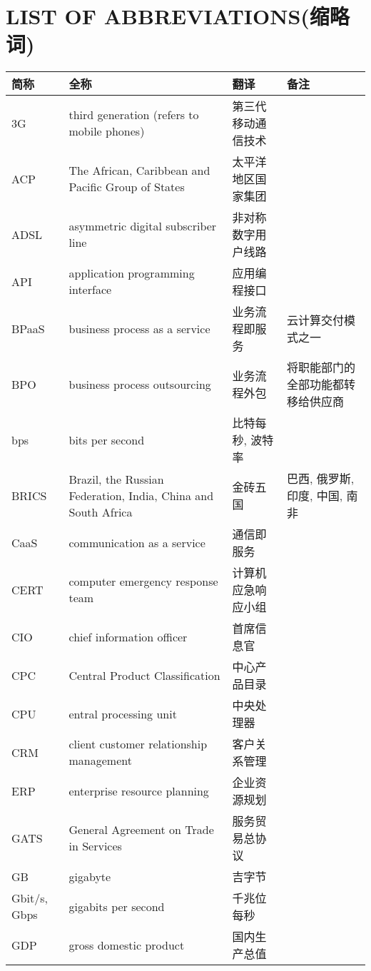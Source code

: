 \documentclass[a4paper, UTF8, 12pt]{article}
\begin{document}
\section{LIST OF ABBREVIATIONS(缩略词)}
\begin{longtable}{m{2cm}m{3cm}m{3cm}m{4cm}}
    \hline
    {\bfseries 简称} & {\bfseries 全称} & {\bfseries 翻译} & {\bfseries 备注}\\[5pt] \hline
    3G & third generation (refers to mobile phones) & 第三代移动通信技术 & \\
    \hline
    ACP & The African, Caribbean and Pacific Group of States & 太平洋地区国家集团 & \\
    \hline
    ADSL & asymmetric digital subscriber line & 非对称数字用户线路 & \\  
    \hline
    API & application programming interface & 应用编程接口 & \\
    \hline
    BPaaS & business process as a service & 业务流程即服务 & 云计算交付模式之一 \\
    \hline
    BPO & business process outsourcing & 业务流程外包 & 将职能部门的全部功能都转移给供应商 \\
    \hline
    bps & bits per second & 比特每秒, 波特率 & \\
    \hline
    BRICS & Brazil, the Russian Federation, India, China and South Africa & 金砖五国 & 巴西, 俄罗斯, 印度, 中国, 南非\\
    \hline
    CaaS & communication as a service & 通信即服务 & \\
    \hline
    CERT & computer emergency response team & 计算机应急响应小组 &\\
    \hline
    CIO & chief information officer & 首席信息官 & \\
    \hline
    CPC & Central Product Classification & 中心产品目录 & \\
    \hline
    CPU & entral processing unit & 中央处理器 & \\
    \hline
    CRM & client customer relationship management & 客户关系管理 &\\
    \hline
    ERP & enterprise resource planning & 企业资源规划 & \\
    \hline
    GATS & General Agreement on Trade in Services & 服务贸易总协议 & \\
    \hline
    GB & gigabyte & 吉字节 & \\
    \hline
    Gbit/s, Gbps & gigabits per second & 千兆位每秒 & \\
    \hline
    GDP & gross domestic product & 国内生产总值 & \\

\end{longtable}
\end{document}
